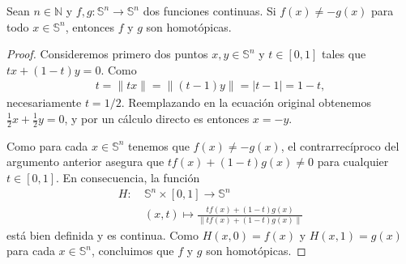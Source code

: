 \documentclass[11pt]{article}
\newcommand{\N}{\mathbb{N}}
\newcommand{\Ss}{\mathbb{S}}
\newcommand{\paint}[1]{\color{color}{#1}}
\newenvironment{lemma}[2][Lema]{\begin{trivlist}
\item[\hskip \labelsep \paint{{\bfseries #1}}\hskip \labelsep {\bfseries #2.}]}{\end{trivlist}}
\begin{document}
\begin{lemma}{4} Sean $n \in \N$ y $f,g : \Ss^n \to \Ss^n$ dos funciones continuas. Si $f(x) \neq -g(x)$ para todo $x \in \Ss^n$, entonces $f$ y $g$ son homot\'opicas.
\end{lemma}
\begin{proof} Consideremos primero dos puntos $x,y \in \Ss^n$ y $t \in [0,1]$  tales que $tx + (1-t)y = 0$. Como 
\begin{align*}
t = \|tx\| = \|(t-1)y\| = |t-1| = 1-t,
\end{align*}
necesariamente $t = 1/2$. Reemplazando en la ecuaci\'on original obtenemos $\frac{1}{2}x + \frac{1}{2}y = 0$, y por un c\'alculo directo es entonces $x = -y$. 

Como para cada $x \in \Ss^n$ tenemos que $f(x) \neq -g(x)$, el contrarrec\'iproco del argumento anterior asegura que $tf(x) + (1-t)g(x) \neq 0$ para cualquier $t \in [0,1]$. En consecuencia, la funci\'on
\begin{align*}
H : \ &\Ss^n \times [0,1] \longrightarrow \Ss^n \\
&(x,t) \mapsto \frac{tf(x) + (1-t)g(x)}{\|tf(x) + (1-t)g(x)\|}
\end{align*}
est\'a bien definida y es continua. Como $H(x,0) = f(x)$ y $H(x,1) = g(x)$ para cada $x \in \Ss^n$, concluimos que $f$ y $g$ son homot\'opicas.
\end{proof}
\end{document}
